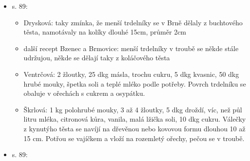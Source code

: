 \begin{itemize}
\begin{itemize}
    \begin{itemize}
    \tightlist
    \item
      ve Vlčnově je tradice pečení trdelníků v několika rodinách živá do
      současnosti, v meziválečným období byl běžně rozšířenej, jako
      koblihy a boží milosti
    \item
      v Březové u UH se trdelníky udržely jen do druhé světové války
    \item
      další recepty z Uherského Hradiště, Blanska, Brna-Tuřan
    \item
      pokud se sype mákem, tak nemletým
    \item
       vyfukování horký páry po upečení
    \item
      další recepty:

      \begin{itemize}
      \tightlist
      \item
        Kellerová, ÚLUV: 2 vejce, žloutek, mléko, šlehačka, másla, sůl,
        mouky tolik, aby se vypracovalo vláčné těsto (není kynutý!).
        Vyválí se široký pruhy, který se navinou na formu, potře se
        rozšlehaným vejcem, posype ořechy, mandlemi, nebo celým mákem a
        peče v troubě
      \item
        Petržel, ÚLUV: 7 dkg másla, 7 dkg sádla, 2,5 dcl mléka, 3 dkg
        kvasnic, 60 dkg polohrubé mouky, potírá se bílkem, sype ořechy
      \item
        Drysková, ÚLUV: 35 dkg cukru, 8 dkg kvasnic, 8 žloutků, 40 dkg
        másla, 2 dkg soli, citronová kůra, 1,75 kg hladké mouky, 50 dkg
        hrubé mouky. Sypalo se celým mákem nebo ořechy. Těsto se taky
        mohlo dělat z obyčejnýho buchtovýho.
      \end{itemize}
    \end{itemize}
  \item
    s. 89:

    \begin{itemize}
    \tightlist
    \item
      Drysková: taky zmínka, že menší trdelníky se v Brně dělaly z
      buchtového těsta, namotávaly na kolíky dlouhé 15cm, průměr 2cm
    \item
      další recept Bzenec a Brmovice: menší trdelníky v troubě se někde
      stále udržujou, někde se dělají taky z koláčového těsta
    \item
      Ventrčová: 2 žloutky, 25 dkg másla, trochu cukru, 5 dkg kvasnic,
      50 dkg hrubé mouky, špetka soli a teplé mléko podle potřeby.
      Povrch trdelníku se obaluje v ořechách s cukrem a osypátku.
    \item
      Škrlová: 1 kg polohrubé mouky, 3 až 4 žloutky, 5 dkg droždí, víc,
      než půl litru mléka, citronová kůra, vanila, malá lžička soli, 10
      dkg cukru. Válečky z kynutýho těsta se navíjí na dřevěnou nebo
      kovovou formu dlouhou 10 až 15 cm. Potřou se vajíčkem a vloží na
      rozemletý ořechy, pečou se v troubě.
    \end{itemize}
  \item
    s. 89:


\end{itemize}
\end{itemize}

